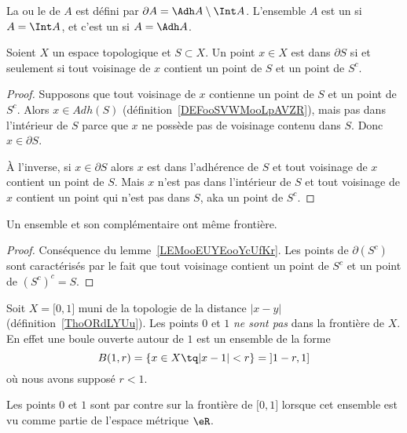 \begin{definition}      \label{DEFooACVLooRwehTl}
  La  ou le  de $A$ est défini par $\partial A = \Adh A \setminus \Int A$. L'ensemble $A$ est un  si $A = \Int A$, et c'est un  si $A = \Adh A$.
\end{definition}

\begin{lemma}      \label{LEMooEUYEooYcUfKr}
    Soient \( X\) un espace topologique et \( S\subset X\). Un point \( x\in X\) est dans \( \partial S\) si et seulement si tout voisinage de \( x\) contient un point de \( S\) et un point de \( S^c\).
\end{lemma}

\begin{proof}
    Supposons que tout voisinage de \( x\) contienne un point de \( S\) et un point de \( S^c\). Alors \( x\in Adh(S)\) (définition~\ref{DEFooSVWMooLpAVZR}), mais pas dans l'intérieur de \( S\) parce que \( x\) ne possède pas de voisinage contenu dans \( S\). Donc \( x\in \partial S\).

    À l'inverse, si \( x\in\partial S\) alors \( x\) est dans l'adhérence de \( S\) et tout voisinage de \( x\) contient un point de \( S\). Mais \( x\) n'est pas dans l'intérieur de \( S\) et tout voisinage de \( x\) contient un point qui n'est pas dans \( S\), aka un point de \( S^c\).
\end{proof}

\begin{corollary}
    Un ensemble et son complémentaire ont même frontière.
\end{corollary}

\begin{proof}
    Conséquence du lemme~\ref{LEMooEUYEooYcUfKr}. Les points de \( \partial(S^c)\) sont caractérisés par le fait que tout voisinage contient un point de \( S^c\) et un point de \( (S^c)^c=S\).
\end{proof}

\begin{example}
    Soit \( X=\mathopen[ 0 , 1 \mathclose]\) muni de la topologie de la distance \( | x-y |\) (définition~\ref{ThoORdLYUu}). Les points \( 0\) et \( 1\) \emph{ne sont pas} dans la frontière de $X$. En effet une boule ouverte autour de \( 1\) est un ensemble de la forme
    \begin{equation}
        B(1,r)=\{ x\in X\tq | x-1 |<r \}=\mathopen] 1-r , 1 \mathclose]
    \end{equation}
    où nous avons supposé \( r<1\).

    Les points \( 0\) et \( 1\) sont par contre sur la frontière de \( \mathopen[ 0 , 1 \mathclose]\) lorsque cet ensemble est vu comme partie de l'espace métrique \( \eR\).
\end{example}


